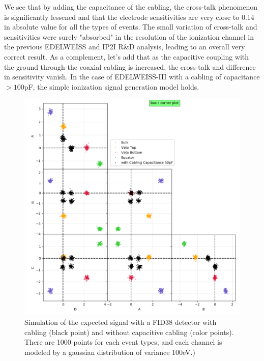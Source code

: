 We see that by adding the capacitance of the cabling, the cross-talk phenomenon is significantly lessened and that the electrode sensitivities are very close to 0.14 in absolute value for all the types of events. The small variation of cross-talk and sensitivities were surely "absorbed" in the resolution of the ionization channel in the previous EDELWEISS and IP2I R\&D analysis, leading to an overall very correct result. As a complement, let's add that as the capacitive coupling with the ground through the coaxial cabling is increased, the cross-talk and difference in sensitivity vanish. In the case of EDELWEISS-III with a cabling of capacitance $>100$pF, the simple ionization signal generation model holds.

\begin{figure}
\centering
\includegraphics[width=\linewidth]{Figures/Electrodes/predict_corner_plot.png}
\caption{Simulation of the expected signal with a FID38 detector with cabling (black point) and without capacitive cabling (color points). There are 1000 points for each event types, and each channel is modeled by a gaussian distribution of variance 100eV.)}
\label{fig:lumped-capacitance}
\end{figure}

